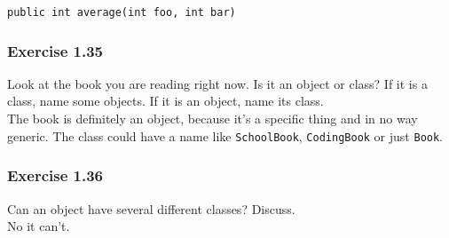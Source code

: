 \lstinline{public int average(int foo, int bar)}

\subsubsection*{Exercise 1.35}
Look at the book you are reading right now. Is it an object or class? If it is
a class, name some objects. If it is an object, name its class.\\

The book is definitely an object, because it's a specific thing and in no way 
generic. The class could have a name like \lstinline{SchoolBook}, 
\lstinline{CodingBook} or just \lstinline{Book}.

\subsubsection*{Exercise 1.36}
Can an object have several different classes? Discuss.\\

No it can't.
